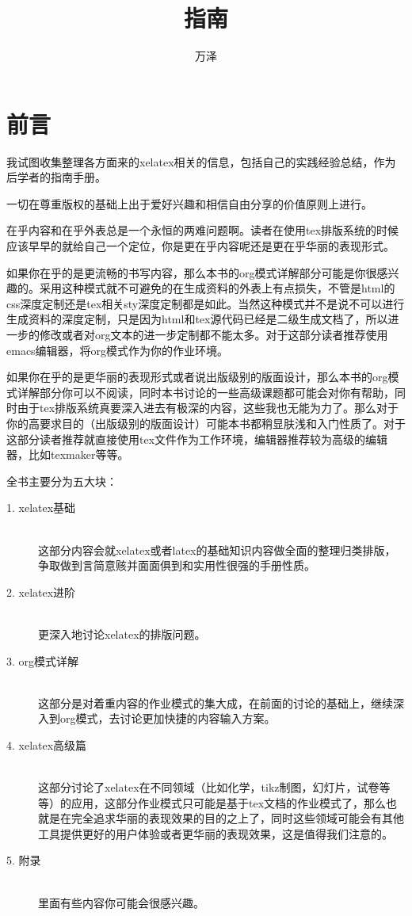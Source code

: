\documentclass[11pt,oneside]{book}
\begin{document}
\frontmatter 

\title{\XeLaTeX 指南}
\author{万泽}
\maketitle

\chapter*{前言}
我试图收集整理各方面来的xelatex相关的信息，包括自己的实践经验总结，作为后学者的指南手册。

一切在尊重版权的基础上出于爱好兴趣和相信自由分享的价值原则上进行。

在乎内容和在乎外表总是一个永恒的两难问题啊。读者在使用tex排版系统的时候应该早早的就给自己一个定位，你是更在乎内容呢还是更在乎华丽的表现形式。

如果你在乎的是更流畅的书写内容，那么本书的org模式详解部分可能是你很感兴趣的。采用这种模式就不可避免的在生成资料的外表上有点损失，不管是html的css深度定制还是tex相关sty深度定制都是如此。当然这种模式并不是说不可以进行生成资料的深度定制，只是因为html和tex源代码已经是二级生成文档了，所以进一步的修改或者对org文本的进一步定制都不能太多。对于这部分读者推荐使用emacs编辑器，将org模式作为你的作业环境。

如果你在乎的是更华丽的表现形式或者说出版级别的版面设计，那么本书的org模式详解部分你可以不阅读，同时本书讨论的一些高级课题都可能会对你有帮助，同时由于tex排版系统真要深入进去有极深的内容，这些我也无能为力了。那么对于你的高要求目的（出版级别的版面设计）可能本书都稍显肤浅和入门性质了。对于这部分读者推荐就直接使用tex文件作为工作环境，编辑器推荐较为高级的编辑器，比如texmaker等等。


全书主要分为五大块：
\begin{description}
\item[1. xelatex基础] \hfill \\
这部分内容会就xelatex或者latex的基础知识内容做全面的整理归类排版，争取做到言简意赅并面面俱到和实用性很强的手册性质。

\item[2. xelatex进阶] \hfill \\
更深入地讨论xelatex的排版问题。

\item[3. org模式详解] \hfill \\
这部分是对着重内容的作业模式的集大成，在前面的讨论的基础上，继续深入到org模式，去讨论更加快捷的内容输入方案。

\item[4. xelatex高级篇] \hfill \\
这部分讨论了xelatex在不同领域（比如化学，tikz制图，幻灯片，试卷等等）的应用，这部分作业模式只可能是基于tex文档的作业模式了，那么也就是在完全追求华丽的表现效果的目的之上了，同时这些领域可能会有其他工具提供更好的用户体验或者更华丽的表现效果，这是值得我们注意的。

\item[5. 附录] \hfill \\
里面有些内容你可能会很感兴趣。
\end{description}
\end{document}
